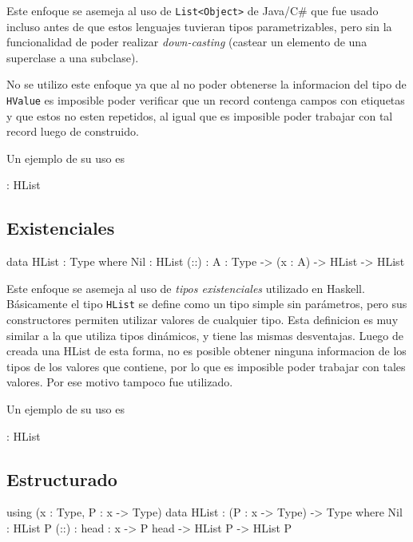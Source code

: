 Este enfoque se asemeja al uso de \texttt{List<Object>} de Java/C\# que fue usado incluso antes de que estos lenguajes tuvieran tipos parametrizables, pero sin la funcionalidad de poder realizar \textit{down-casting} (castear un elemento de una superclase a una subclase).

No se utilizo este enfoque ya que al no poder obtenerse la informacion del tipo de \texttt{HValue} es imposible poder verificar que un record contenga campos con etiquetas y que estos no esten repetidos, al igual que es imposible poder trabajar con tal record luego de construido.

Un ejemplo de su uso es 

\begin{code}
 : HList
\end{code}

\subsection{Existenciales}

\begin{code}
data HList : Type where
    Nil : HList
    (::) : {A : Type} -> (x : A) -> HList -> HList
\end{code}

Este enfoque se asemeja al uso de \textit{tipos existenciales} utilizado en Haskell. Básicamente el tipo \texttt{HList} se define como un tipo simple sin parámetros, pero sus constructores permiten utilizar valores de cualquier tipo.
Esta definicion es muy similar a la que utiliza tipos dinámicos, y tiene las mismas desventajas. Luego de creada una HList de esta forma, no es posible obtener ninguna informacion de los tipos de los valores que contiene, por lo que es imposible poder trabajar con tales valores. Por ese motivo tampoco fue utilizado.

Un ejemplo de su uso es

\begin{code}
[1,"2"] : HList
\end{code}

\subsection{Estructurado}

\begin{code}
using (x : Type, P : x -> Type)        
    data HList : (P : x -> Type) ->  Type where
        Nil : HList P
        (::) : {head : x} -> P head -> HList P -> 
          HList P 
\end{code}

